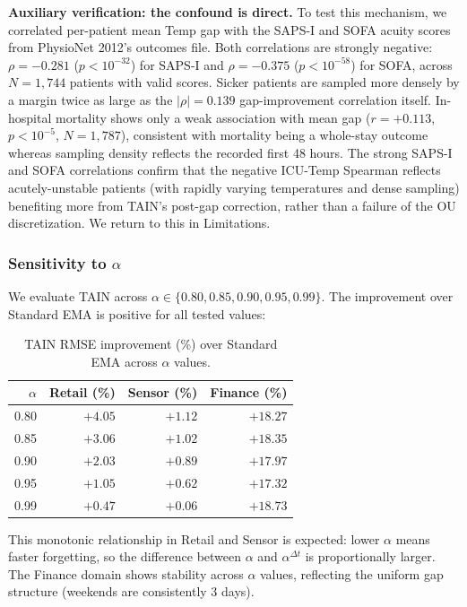 \documentclass[11pt,a4paper]{article}
\begin{document}
\textbf{Auxiliary verification: the confound is direct.}
To test this mechanism, we correlated per-patient mean Temp gap with the
SAPS-I and SOFA acuity scores from PhysioNet 2012's outcomes file. Both
correlations are strongly negative: $\rho = -0.281$ ($p < 10^{-32}$) for
SAPS-I and $\rho = -0.375$ ($p < 10^{-58}$) for SOFA, across $N = 1{,}744$
patients with valid scores. Sicker patients are sampled more densely by a
margin twice as large as the $|\rho|=0.139$ gap-improvement correlation
itself. In-hospital mortality shows only a weak association with mean gap
($r = +0.113$, $p < 10^{-5}$, $N = 1{,}787$), consistent with mortality being
a whole-stay outcome whereas sampling density reflects the recorded first
48 hours. The strong SAPS-I and SOFA correlations confirm that the negative
ICU-Temp Spearman reflects acutely-unstable patients (with rapidly varying
temperatures and dense sampling) benefiting more from TAIN's post-gap
correction, rather than a failure of the OU discretization. We return to
this in Limitations.

\subsubsection{Sensitivity to $\alpha$}

We evaluate TAIN across $\alpha \in \{0.80, 0.85, 0.90, 0.95, 0.99\}$.
The improvement over Standard EMA is positive for all tested values:

\begin{table}[h]
\centering
\caption{TAIN RMSE improvement (\%) over Standard EMA across $\alpha$ values.}
\label{tab:alpha}
\begin{tabular}{rrrr}
\toprule
$\alpha$ & Retail (\%) & Sensor (\%) & Finance (\%) \\
\midrule
0.80 & $+4.05$ & $+1.12$ & $+18.27$ \\
0.85 & $+3.06$ & $+1.02$ & $+18.35$ \\
0.90 & $+2.03$ & $+0.89$ & $+17.97$ \\
0.95 & $+1.05$ & $+0.62$ & $+17.32$ \\
0.99 & $+0.47$ & $+0.06$ & $+18.73$ \\
\bottomrule
\end{tabular}
\end{table}

This monotonic relationship in Retail and Sensor is expected: lower $\alpha$ means
faster forgetting, so the difference between $\alpha$ and $\alpha^{\Delta t}$
is proportionally larger. The Finance domain shows stability across $\alpha$ values,
reflecting the uniform gap structure (weekends are consistently 3 days).
\end{document}
